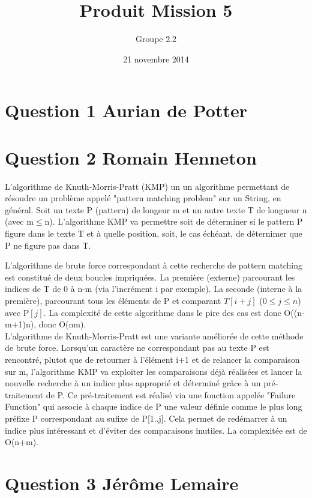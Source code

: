 \documentclass[10pt,a4paper]{article}
\date{21 novembre 2014}
\author{Groupe 2.2}
\title{Produit Mission 5}
\begin{document}
\maketitle

\section*{Question 1 Aurian de Potter}
\section*{Question 2 Romain Henneton}
L'algorithme de Knuth-Morris-Pratt (KMP) un un algorithme permettant de résoudre un problème appelé "pattern matching problem" sur un String, en général. Soit un texte P (pattern) de longeur m et un autre texte T de longueur n (avec m$\leq$n). L'algorithme KMP va permettre soit de déterminer si le pattern P figure dans le texte T et à quelle position, soit, le cas échéant, de déternimer que P ne figure pas dans T.



L'algorithme de brute force correspondant à cette recherche de pattern matching est constitué de deux boucles impriquées. La première (externe) parcourant les indices de T de 0 à n-m (via l'incrément i par exemple). La seconde (interne à la première), parcourant tous les éléments de P et comparant $T[i+j]$ ($0\leq j\leq n$) avec P$[j]$. La complexité de cette algorithme dans le pire des cas est donc O((n-m+1)n), donc O(nm).\\
L'algorithme de Knuth-Morris-Pratt est une variante améliorée de cette méthode de brute force. Lorsqu'un caractère ne correspondant pas au texte P est rencontré, plutot que de retourner à l'élément i+1 et de relancer la comparaison sur m, l'algorithme KMP va exploiter les comparaisons déjà réalisées et lancer la nouvelle recherche à un indice plus approprié et déterminé grâce à un pré-traitement de P. Ce pré-traitement est réalisé via une fonction appelée "Failure Function" qui associe à chaque indice de P une valeur définie comme le plus long préfixe P correspondant au sufixe de P[1..j]. Cela permet de redémarrer à un indice plus intéressant et d'éviter des comparaisons inutiles. La complexitée  est de O(n+m).
\section*{Question 3 Jérôme Lemaire}
\end{document}

